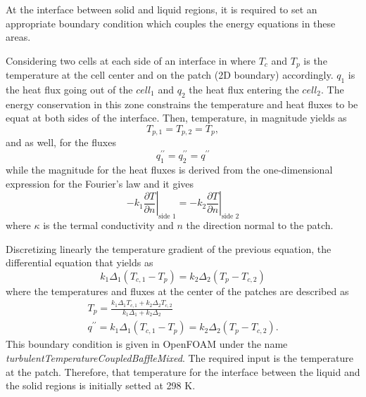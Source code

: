 \noindent At the interface between solid and liquid regions, it is required to set an appropriate boundary condition which couples the energy equations in these areas.

\noindent Considering two cells at each side of an interface in where $T_c$ and $T_p$ is the temperature at the cell center and on the patch (2D boundary) accordingly. $q_1$ is the heat flux going out of the $cell_1$ and $q_2$ the heat flux entering the $cell_2$. The energy conservation in this zone constrains the temperature and heat fluxes to be equat at both sides of the interface. 
Then, temperature, in magnitude yields as
\begin{equation}
	T_{p, 1}=T_{p, 2}=T_{p},
	\label{4.9}
\end{equation}
and as well, for the fluxes
\begin{equation}
	q_{1}^{\prime \prime}=q_{2}^{\prime \prime}=q^{\prime \prime}
	\label{4.10}
\end{equation}
while the magnitude for the heat fluxes is derived from the one-dimensional expression for the Fourier's law and it gives
\begin{equation}
	-\left.k_{1} \frac{\partial T}{\partial n}\right|_{\text {side } 1}=-\left.k_{2} \frac{\partial T}{\partial n}\right|_{\text {side } 2}
	\label{4.11}
\end{equation}
where $\kappa$ is the termal conductivity and $n$ the direction normal to the patch.

\noindent Discretizing linearly the temperature gradient of the previous equation, the differential equation that yields as
\begin{equation}
	k_{1} \Delta_{1}\left(T_{c, 1}-T_{p}\right)=k_{2} \Delta_{2}\left(T_{p}-T_{c, 2}\right)
	\label{4.12}
\end{equation}
where the temperatures and fluxes at the center of the patches are described as
\begin{equation}
	\begin{gathered}
	T_{p}=\frac{k_{1} \Delta_{1} T_{c, 1}+k_{2} \Delta_{2} T_{c, 2}}{k_{1} \Delta_{1}+k_{2} \Delta_{2}} \\
	q^{\prime \prime}=k_{1} \Delta_{1}\left(T_{c, 1}-T_{p}\right)=k_{2} \Delta_{2}\left(T_{p}-T_{c, 2}\right) .
	\end{gathered}
	\label{4.13}
\end{equation}
This boundary condition is given in OpenFOAM under the name \textit{turbulentTemperatureCoupledBaffleMixed}. The required input is the temperature at the patch. Therefore, that temperature for the interface between the liquid and the solid regions is initially setted at 298 K.

